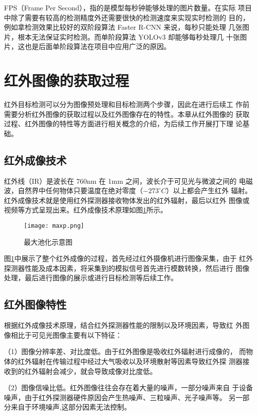 FPS（Frame Per Second），指的是模型每秒钟能够处理的图片数量。在实际
项目中除了需要有较高的检测精度外还需要很快的检测速度来实现实时检测的
目的，例如拿检测效果比较好的双阶段算法 Faster R-CNN 来说，每秒只能处理
几张图片，根本无法保证实时检测。而单阶段算法 YOLOv3 却能够每秒处理几
十张图片，这也是后面单阶段算法在项目中应用广泛的原因。

\section{红外图像的获取过程}
红外目标检测可以分为图像预处理和目标检测两个步骤，因此在进行后续工
作前需要分析红外图像的获取过程以及红外图像存在的特性。本章从红外图像的
获取过程、红外图像的特性等方面进行相关概念的介绍，为后续工作开展打下理
论基础。
\subsection{红外成像技术}
红外线（IR）是波长在 760nm 在 1mm 之间，波长介于可见光与微波之间的
电磁波，自然界中任何物体只要温度在绝对零度（$-273 ^{\circ}C$）以上都会产生红外
辐射。红外成像技术就是使用红外探测器接收物体发出的红外辐射，最后以红外
图像或视频等方式呈现出来。红外成像技术原理如图\ref{infra}所示\cite{倪国强2008中国红外成像技术发展的若干思考}。

\begin{figure}[htbp]
    \centering
    \texttt{[image: maxp.png]}
    \caption{最大池化示意图}
    \label{infra}
\end{figure}

图\ref{infra}中展示了整个红外成像的过程，首先经过红外摄像机进行图像采集，由于
红外探测器性能及成本因素，将采集到的模拟信号首先进行模数转换，然后进行
图像处理，最后进行图像的展示或进行目标检测等后续工作。

\subsection{红外图像特性} 
根据红外成像技术原理，结合红外探测器性能的限制以及环境因素，导致红
外图像相比于可见光图像主要有以下特征：

（1）图像分辨率差、对比度低。由于红外图像是吸收红外辐射进行成像的，
而物体的红外辐射在传输过程中经过大气吸收以及环境散射等因素导致红外探
测器接收到的红外辐射会减少，就会导致成像对比度低。

（2）图像信噪比低。红外图像往往会存在着大量的噪声，一部分噪声来自
于设备噪声，由于红外探测器硬件原因会产生热噪声、三粒噪声、光子噪声等。
另一部分来自于环境噪声,这部分因素无法控制。

